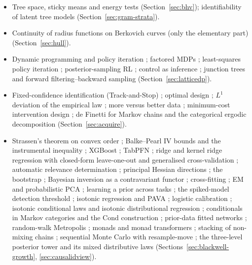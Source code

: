 \documentclass[11pt]{article}
\theoremstyle{definition}
\theoremstyle{remark}
\begin{document}
\begin{itemize}[itemsep=0pt]
  \item Tree space, sticky means and energy tests \cite{bhv,hotz,szekely} (Section~\ref{sec:bhv}); identifiability of latent tree models \cite{amr09} (Section~\ref{sec:gram-strata}).
  \item Continuity of radius functions on Berkovich curves (only the elementary part) \cite{pulita} (Section~\ref{sec:hull}).
  \item Dynamic programming and policy iteration \cite{bellman57,howard60}; factored MDPs \cite{guestrin03}; least-squares policy iteration \cite{lagoudakisparr03}; posterior-sampling RL \cite{osband13}; control as inference \cite{levine18}; junction trees and forward filtering--backward sampling \cite{lauritzen88,carterkohn94,fruhwirth94} (Section~\ref{sec:latticedp}).
  \item Fixed-confidence identification (Track-and-Stop) \cite{garivierkaufmann16}; optimal design \cite{kieferwolfowitz60,pukelsheim93}; $L^1$ deviation of the empirical law \cite{weissman03}; more versus better data \cite{dominitzmanski17}; minimum-cost intervention design \cite{akbari22}; de Finetti for Markov chains and the categorical ergodic decomposition \cite{diaconisfreedman80,mossperrone22} (Section~\ref{sec:acquire}).
  \item Strassen's theorem on convex order \cite{strassen65}; Balke--Pearl IV bounds and the instrumental inequality \cite{balkepearl97,pearl95}; XGBoost \cite{xgboost}; TabPFN \cite{tabpfn}; ridge and kernel ridge regression \cite{hoerlkennard70,saunders98} with closed-form leave-one-out and generalised cross-validation \cite{allen74,golubheathwahba79}; automatic relevance determination \cite{mackay92,tipping01}; principal Hessian directions \cite{li92}; the bootstrap \cite{efrontibshirani93}; Bayesian inversion as a contravariant functor \cite{chojacobs19,smithe20}; cross-fitting \cite{chernozhukov18}; EM and probabilistic PCA \cite{dempster77,tippingbishop99}; learning a prior across tasks \cite{baxter00}; the spiked-model detection threshold \cite{bbp05}; isotonic regression and PAVA \cite{robertson88,deleeuw09}; logistic calibration \cite{platt99}; isotonic conditional laws and isotonic distributional regression \cite{arnoldziegel25,henzi21,brunk65}; conditionals in Markov categories and the Cond construction \cite{fritz,steinstaton21}; prior-data fitted networks \cite{mullerpfn22}; random-walk Metropolis \cite{metropolis53,hastings70}; monads and monad transformers \cite{moggi91,lianghudakjones95}; stacking of non-mixing chains \cite{yao22stacking}; sequential Monte Carlo with resample-move \cite{chopin02,gilksberzuini01}; the three-level posterior tower and its mixed distributive laws \cite{awasthiT} (Sections~\ref{sec:blackwell-growth}, \ref{sec:causalidview}).

\end{itemize}
\end{document}
